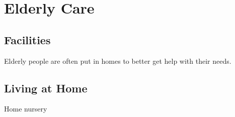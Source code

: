 \section{Elderly Care}
\subsection{Facilities}
Elderly people are often put in homes to better get help with their needs.
\subsection{Living at Home}
Home nursery
